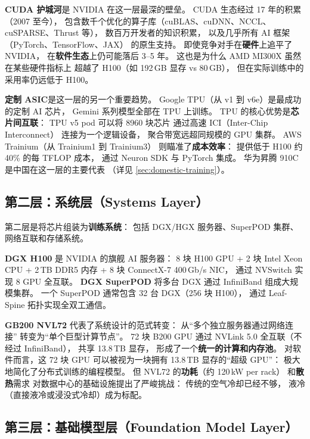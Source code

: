 \textbf{CUDA 护城河}是 NVIDIA 在这一层最深的壁垒。
CUDA 生态经过 17 年的积累（2007 至今），
包含数千个优化的算子库（cuBLAS、cuDNN、NCCL、
cuSPARSE、Thrust 等），
数百万开发者的知识积累，
以及几乎所有 AI 框架（PyTorch、TensorFlow、JAX）
的原生支持。
即使竞争对手在\textbf{硬件}上追平了 NVIDIA，
在\textbf{软件生态}上仍可能落后 3--5 年。
这也是为什么 AMD MI300X 虽然在某些硬件指标上
超越了 H100（如 192\,GB 显存 vs 80\,GB），
但在实际训练中的采用率仍远低于 H100。

\textbf{定制 ASIC}是这一层的另一个重要趋势。
Google TPU（从 v1 到 v6e）是最成功的定制 AI 芯片，
Gemini 系列模型全部在 TPU 上训练。
TPU 的核心优势是\textbf{芯片间互联}：
TPU v5 pod 可以将 8960 块芯片
通过高速 ICI（Inter-Chip Interconnect）
连接为一个逻辑设备，
聚合带宽远超同规模的 GPU 集群。
AWS Trainium（从 Trainium1 到 Trainium3）
则瞄准了\textbf{成本效率}：
提供低于 H100 约 40\% 的每 TFLOP 成本，
通过 Neuron SDK 与 PyTorch 集成。
华为昇腾 910C 是中国在这一层的主要代表
（详见 \cref{sec:domestic-training}）。

\subsection{第二层：系统层（Systems Layer）}

第二层是将芯片组装为\textbf{训练系统}：
包括 DGX/HGX 服务器、SuperPOD 集群、
网络互联和存储系统。

\textbf{DGX H100} 是 NVIDIA 的旗舰 AI 服务器：
8 块 H100 GPU + 2 块 Intel Xeon CPU +
2\,TB DDR5 内存 + 8 块 ConnectX-7 400\,Gb/s NIC，
通过 NVSwitch 实现 8 GPU 全互联。
\textbf{DGX SuperPOD} 将多台 DGX 通过
InfiniBand 组成大规模集群。
一个 SuperPOD 通常包含 32 台 DGX（256 块 H100），
通过 Leaf-Spine 拓扑实现全双工通信。

\textbf{GB200 NVL72} 代表了系统设计的范式转变：
从“多个独立服务器通过网络连接”
转变为“单个巨型计算节点”。
72 块 B200 GPU 通过 NVLink 5.0 全互联（不经过 InfiniBand），
共享 13.8\,TB 显存，
形成了一个\textbf{统一的计算和内存池}。
对软件而言，这 72 块 GPU
可以被视为一块拥有 13.8\,TB 显存的“超级 GPU”：
极大地简化了分布式训练的编程模型。
但 NVL72 的\textbf{功耗}（约 120\,kW per rack）
和\textbf{散热}需求
对数据中心的基础设施提出了严峻挑战：
传统的空气冷却已经不够，
液冷（直接液冷或浸没式冷却）成为标配。

\subsection{第三层：基础模型层（Foundation Model Layer）}

